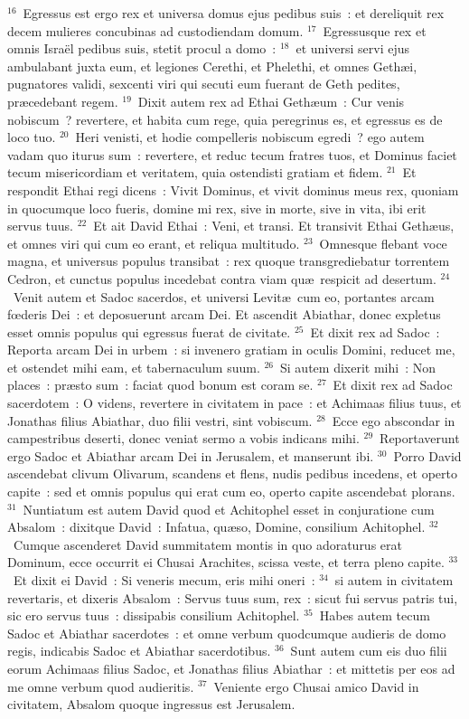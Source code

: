 ${}^{16}$~Egressus est ergo rex et universa domus ejus pedibus suis~: et dereliquit rex decem mulieres concubinas ad custodiendam domum.
${}^{17}$~Egressusque rex et omnis Isra\"el pedibus suis, stetit procul a domo~:
${}^{18}$~et universi servi ejus ambulabant juxta eum, et legiones Cerethi, et Phelethi, et omnes Geth\ae i, pugnatores validi, sexcenti viri qui secuti eum fuerant de Geth pedites, pr\ae cedebant regem.
${}^{19}$~Dixit autem rex ad Ethai Geth\ae um~: Cur venis nobiscum~? revertere, et habita cum rege, quia peregrinus es, et egressus es de loco tuo.
${}^{20}$~Heri venisti, et hodie compelleris nobiscum egredi~? ego autem vadam quo iturus sum~: revertere, et reduc tecum fratres tuos, et Dominus faciet tecum misericordiam et veritatem, quia ostendisti gratiam et fidem.
${}^{21}$~Et respondit Ethai regi dicens~: Vivit Dominus, et vivit dominus meus rex, quoniam in quocumque loco fueris, domine mi rex, sive in morte, sive in vita, ibi erit servus tuus.
${}^{22}$~Et ait David Ethai~: Veni, et transi. Et transivit Ethai Geth\ae us, et omnes viri qui cum eo erant, et reliqua multitudo.
${}^{23}$~Omnesque flebant voce magna, et universus populus transibat~: rex quoque transgrediebatur torrentem Cedron, et cunctus populus incedebat contra viam qu\ae\ respicit ad desertum.
${}^{24}$~Venit autem et Sadoc sacerdos, et universi Levit\ae\ cum eo, portantes arcam fœderis Dei~: et deposuerunt arcam Dei. Et ascendit Abiathar, donec expletus esset omnis populus qui egressus fuerat de civitate.
${}^{25}$~Et dixit rex ad Sadoc~: Reporta arcam Dei in urbem~: si invenero gratiam in oculis Domini, reducet me, et ostendet mihi eam, et tabernaculum suum.
${}^{26}$~Si autem dixerit mihi~: Non places~: pr\ae sto sum~: faciat quod bonum est coram se.
${}^{27}$~Et dixit rex ad Sadoc sacerdotem~: O videns, revertere in civitatem in pace~: et Achimaas filius tuus, et Jonathas filius Abiathar, duo filii vestri, sint vobiscum.
${}^{28}$~Ecce ego abscondar in campestribus deserti, donec veniat sermo a vobis indicans mihi.
${}^{29}$~Reportaverunt ergo Sadoc et Abiathar arcam Dei in Jerusalem, et manserunt ibi.
${}^{30}$~Porro David ascendebat clivum Olivarum, scandens et flens, nudis pedibus incedens, et operto capite~: sed et omnis populus qui erat cum eo, operto capite ascendebat plorans.
${}^{31}$~Nuntiatum est autem David quod et Achitophel esset in conjuratione cum Absalom~: dixitque David~: Infatua, qu\ae so, Domine, consilium Achitophel.
${}^{32}$~Cumque ascenderet David summitatem montis in quo adoraturus erat Dominum, ecce occurrit ei Chusai Arachites, scissa veste, et terra pleno capite.
${}^{33}$~Et dixit ei David~: Si veneris mecum, eris mihi oneri~:
${}^{34}$~si autem in civitatem revertaris, et dixeris Absalom~: Servus tuus sum, rex~: sicut fui servus patris tui, sic ero servus tuus~: dissipabis consilium Achitophel.
${}^{35}$~Habes autem tecum Sadoc et Abiathar sacerdotes~: et omne verbum quodcumque audieris de domo regis, indicabis Sadoc et Abiathar sacerdotibus.
${}^{36}$~Sunt autem cum eis duo filii eorum Achimaas filius Sadoc, et Jonathas filius Abiathar~: et mittetis per eos ad me omne verbum quod audieritis.
${}^{37}$~Veniente ergo Chusai amico David in civitatem, Absalom quoque ingressus est Jerusalem.

